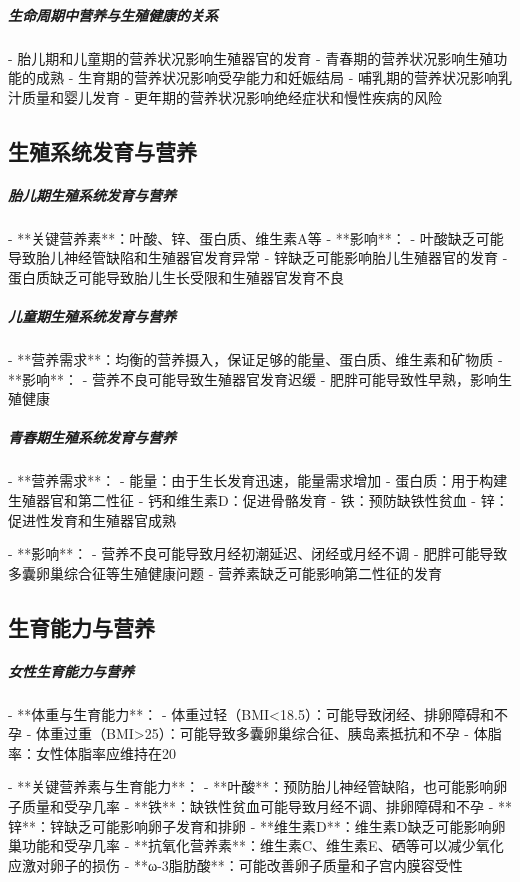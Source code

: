 \begin{enumerate}
\subparagraph{生命周期中营养与生殖健康的关系}

- 胎儿期和儿童期的营养状况影响生殖器官的发育
- 青春期的营养状况影响生殖功能的成熟
- 生育期的营养状况影响受孕能力和妊娠结局
- 哺乳期的营养状况影响乳汁质量和婴儿发育
- 更年期的营养状况影响绝经症状和慢性疾病的风险

\subsection{生殖系统发育与营养}

\subparagraph{胎儿期生殖系统发育与营养}

- **关键营养素**：叶酸、锌、蛋白质、维生素A等
- **影响**：
  - 叶酸缺乏可能导致胎儿神经管缺陷和生殖器官发育异常
  - 锌缺乏可能影响胎儿生殖器官的发育
  - 蛋白质缺乏可能导致胎儿生长受限和生殖器官发育不良

\subparagraph{儿童期生殖系统发育与营养}

- **营养需求**：均衡的营养摄入，保证足够的能量、蛋白质、维生素和矿物质
- **影响**：
  - 营养不良可能导致生殖器官发育迟缓
  - 肥胖可能导致性早熟，影响生殖健康

\subparagraph{青春期生殖系统发育与营养}

- **营养需求**：
  - 能量：由于生长发育迅速，能量需求增加
  - 蛋白质：用于构建生殖器官和第二性征
  - 钙和维生素D：促进骨骼发育
  - 铁：预防缺铁性贫血
  - 锌：促进性发育和生殖器官成熟

- **影响**：
  - 营养不良可能导致月经初潮延迟、闭经或月经不调
  - 肥胖可能导致多囊卵巢综合征等生殖健康问题
  - 营养素缺乏可能影响第二性征的发育

\subsection{生育能力与营养}

\subparagraph{女性生育能力与营养}

- **体重与生育能力**：
  - 体重过轻（BMI<18.5）：可能导致闭经、排卵障碍和不孕
  - 体重过重（BMI>25）：可能导致多囊卵巢综合征、胰岛素抵抗和不孕
  - 体脂率：女性体脂率应维持在20%

- **关键营养素与生育能力**：
  - **叶酸**：预防胎儿神经管缺陷，也可能影响卵子质量和受孕几率
  - **铁**：缺铁性贫血可能导致月经不调、排卵障碍和不孕
  - **锌**：锌缺乏可能影响卵子发育和排卵
  - **维生素D**：维生素D缺乏可能影响卵巢功能和受孕几率
  - **抗氧化营养素**：维生素C、维生素E、硒等可以减少氧化应激对卵子的损伤
  - **ω-3脂肪酸**：可能改善卵子质量和子宫内膜容受性


\end{enumerate}
